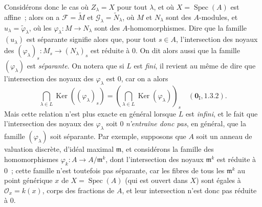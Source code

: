 \begin{env}[11.9.4]
\label{IV.11.9.4-fr}
Considérons donc le cas où $Z_\lambda=X$ pour tout $\lambda$, et où
$X=\operatorname{Spec}(A)$ est affine~; alors on a
$\mathcal F=\widetilde M$ et $\mathcal G_\lambda=\widetilde N_\lambda$, où
$M$ et $N_\lambda$ sont des $A$-modules, et $u_\lambda=\widetilde\varphi_\lambda$,
où les $\varphi_\lambda:M\to N_\lambda$ sont des $A$-homomorphismes. Dire que
la famille $(u_\lambda)$ est séparante signifie alors que, pour tout $s\in A$,
l'intersection des noyaux des
$(\varphi_\lambda)_s:M_s\to(N_\lambda)_s$ est réduite à 0. On dit alors aussi
que la famille $(\varphi_\lambda)$ est \emph{séparante}. On notera que si $L$
est \emph{fini}, il revient au même de dire que l'intersection des noyaux des
$\varphi_\lambda$ est 0, car on a alors
\[
\bigcap_{\lambda\in L}\operatorname{Ker}((\varphi_\lambda)_s)
=\left(\bigcap_{\lambda\in L}\operatorname{Ker}(\varphi_\lambda)\right)_s
\quad(\mathbf 0_{\mathrm I},1.3.2).
\]
Mais cette relation n'est plus exacte en général lorsque $L$ est \emph{infini},
et le fait que l'intersection des noyaux des $\varphi_\lambda$ soit 0
\emph{n'entraîne donc pas},
en général, que la famille $(\varphi_\lambda)$ soit séparante. Par exemple,
supposons que $A$ soit un anneau de valuation discrète, d'idéal maximal
$\mathfrak m$, et considérons la famille des homomorphismes
$\varphi_k:A\to A/\mathfrak m^k$, dont l'intersection des noyaux
$\mathfrak m^k$ est réduite à 0~; cette famille n'est toutefois pas séparante,
car les fibres de tous les $\mathfrak m^k$ au point générique $x$ de
$X=\operatorname{Spec}(A)$ (qui est ouvert dans $X$) sont égales à
$\mathcal O_x=k(x)$, corps des fractions de $A$, et leur intersection n'est
donc pas réduite à 0.
\end{env}

